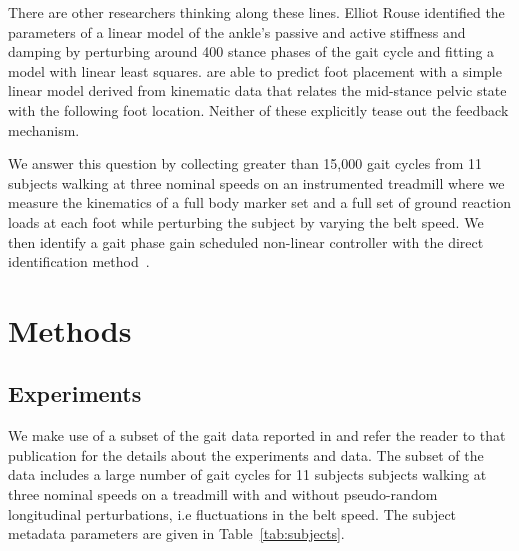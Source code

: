 \documentclass{article}
\begin{document}
There are other researchers thinking along these lines. Elliot Rouse identified
the parameters of a linear model of the ankle's passive and active stiffness
and damping by perturbing around 400 stance phases of the gait cycle and
fitting a model with linear least squares. \cite{Wang2013} are able to predict
foot placement with a simple linear model derived from kinematic data that
relates the mid-stance pelvic state with the following foot location. Neither
of these explicitly tease out the feedback mechanism.

We answer this question by collecting greater than 15,000 gait cycles from 11
subjects walking at three nominal speeds on an instrumented treadmill where we
measure the kinematics of a full body marker set and a full set of ground
reaction loads at each foot while perturbing the subject by varying the belt
speed. We then identify a gait phase gain scheduled non-linear controller with
the direct identification method~\cite{Ljung1999}.

\section*{Methods}
%
\subsection*{Experiments}
%
We make use of a subset of the gait data reported in \cite{Moore2015} and refer
the reader to that publication for the details about the experiments and data.
The subset of the data includes a large number of gait cycles for 11 subjects
subjects walking at three nominal speeds on a treadmill with and without
pseudo-random longitudinal perturbations, i.e fluctuations in the belt speed.
The subject metadata parameters are given in Table~\ref{tab:subjects}.
%
\begin{table}
  \cprotect\caption{Information about the 11 study participants. The final
    three columns provide the trial numbers associated with each nominal
    treadmill speed. The measured mass is computed from the mean total vertical
    ground reaction force just after the calibration pose event. Generated by
    \verb|src/subject_table.py|.}
  \centering
  
  \label{tab:subjects}
\end{table}
\end{document}
